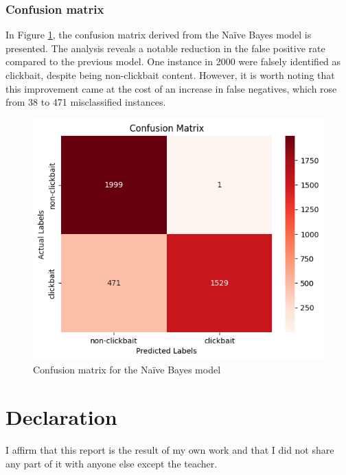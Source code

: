 \documentclass{class}
\begin{document}
\subsubsection*{Confusion matrix}
In Figure \ref{fig-14}, the confusion matrix derived from the Naïve Bayes model is presented.
The analysis reveals a notable reduction in the false positive rate compared to the previous model.
One instance in 2000 were falsely identified as clickbait, despite being non-clickbait content.
However, it is worth noting that this improvement came at the cost of an increase in false negatives,
which rose from 38 to 471 misclassified instances.
\begin{figure}[h]
    \centering
    \includegraphics[width=0.5\columnwidth]{images/fpr_naive_conf_matrix.png}
    \caption{Confusion matrix for the Na\"ive Bayes model}
    \label{fig-14}
\end{figure}

\section{Declaration}
I affirm that this report is the result of my own work and that I did not share any part of it with anyone
else except the teacher.
\end{document}
